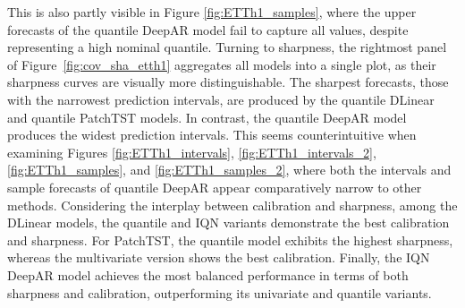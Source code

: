 \documentclass[a4paper,oneside,bibliography=totoc]{scrbook}
\begin{document}
This is also partly visible in Figure \ref{fig:ETTh1_samples}, where the upper forecasts of the quantile DeepAR model fail to capture all values, despite representing a high nominal quantile.
Turning to sharpness, the rightmost panel of Figure~\ref{fig:cov_sha_etth1} aggregates all models into a single plot, as their sharpness curves are visually more distinguishable. The sharpest forecasts, those with the narrowest prediction intervals, are produced by the quantile DLinear and quantile PatchTST models. 
In contrast, the quantile DeepAR model produces the widest prediction intervals. This seems counterintuitive when examining Figures \ref{fig:ETTh1_intervals}, \ref{fig:ETTh1_intervals_2}, \ref{fig:ETTh1_samples}, and \ref{fig:ETTh1_samples_2}, where both the intervals and sample forecasts of quantile DeepAR appear comparatively narrow to other methods. 
Considering the interplay between calibration and sharpness, among the DLinear models, the quantile and IQN variants demonstrate the best calibration and sharpness. For PatchTST, the quantile model exhibits the highest sharpness, whereas the multivariate version shows the best calibration. Finally, the IQN DeepAR model achieves the most balanced performance in terms of both sharpness and calibration, outperforming its univariate and quantile variants.
\end{document}
